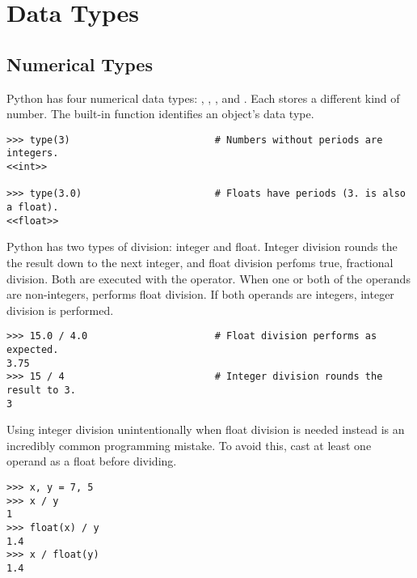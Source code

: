 \section*{Data Types}


\subsection*{Numerical Types}
Python has four numerical data types: , , 
, and .
Each stores a different kind of number.
The built-in function  identifies an object's data type.

\begin{lstlisting}
>>> type(3)                         # Numbers without periods are integers.
<<int>>

>>> type(3.0)                       # Floats have periods (3. is also a float).
<<float>>
\end{lstlisting}

Python has two types of division: integer and float.
Integer division rounds the the result down to the next integer, and float division perfoms true, fractional division.
Both are executed  with the \li{/} operator.
When one or both of the operands are non-integers, \li{/} performs float division.
If both operands are integers, integer division is performed.

\begin{lstlisting}
>>> 15.0 / 4.0                      # Float division performs as expected.
3.75
>>> 15 / 4                          # Integer division rounds the result to 3.
3
\end{lstlisting}

\begin{warn} %
Using integer division unintentionally when float division is needed instead is an incredibly common programming mistake.
To avoid this, cast at least one operand as a float before dividing.
\begin{lstlisting}
>>> x, y = 7, 5
>>> x / y
1
>>> float(x) / y
1.4
>>> x / float(y)
1.4
\end{lstlisting}
\end{warn}

